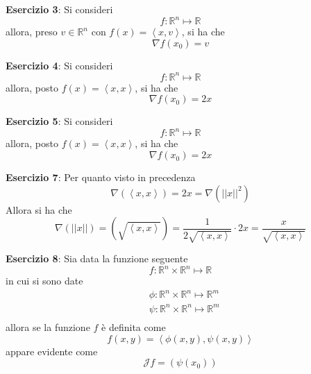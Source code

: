 \documentclass[a4paper]{extarticle}
\begin{document}
\vspace{2em}
\noindent
\textbf{Esercizio 3}: Si consideri
\[f : \mathbb{R}^n \longmapsto \mathbb{R}\]
allora, preso $v \in \mathbb{R}^n$ con $f(x)=\left<x,v\right>$, si ha che
\[\nabla f(x_0) = v\]

\vspace{2em}
\noindent
\textbf{Esercizio 4}: Si consideri
\[f : \mathbb{R}^n \longmapsto \mathbb{R}\]
allora, posto $f(x)=\left<x,x\right>$, si ha che
\[\nabla f(x_0) = 2x\]

\vspace{2em}
\noindent
\textbf{Esercizio 5}: Si consideri
\[f : \mathbb{R}^n \longmapsto \mathbb{R}\]
allora, posto $f(x)=\left<x,x\right>$, si ha che
\[\nabla f(x_0) = 2x\]

\vspace{2em}
\noindent
\textbf{Esercizio 7}: Per quanto visto in precedenza
\[\nabla \left(\left<x,x\right>\right) = 2x = \nabla \left(\vert \vert x \vert \vert^2\right)\]
Allora si ha che
\[\nabla \left(\vert \vert x \vert \vert\right) = \left(\sqrt{\left<x,x\right>}\right) = \dfrac{1}{2 \sqrt{\left<x,x\right>}} \cdot 2x = \dfrac{x}{\sqrt{\left<x,x\right>}}\]

\vspace{2em}
\noindent
\textbf{Esercizio 8}: Sia data la funzione seguente
\[f : \mathbb{R}^n \times \mathbb{R}^n \longmapsto \mathbb{R}\]
in cui si sono date
\begin{align*}
    &\phi : \mathbb{R}^n \times \mathbb{R}^n \longmapsto \mathbb{R}^m\\
    &\psi : \mathbb{R}^n \times \mathbb{R}^n \longmapsto \mathbb{R}^m\\
\end{align*}
allora se la funzione $f$ è definita come
\[f(x,y) = \left<\phi(x,y),\psi(x,y)\right>\]
appare evidente come
\[\mathcal{J} f = \left(\psi(x_0)\right)\]

\vspace{2em}
\noindent
\end{document}
